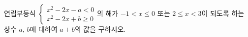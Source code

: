연립부등식 $\begin{cases} x^2-2x-a<0 \\ x^2-2x+b\ge 0 \end{cases}$의 해가 $-1<x\le 0$ 또는 $2\le x<3$이 되도록 하는 상수 $a$, $b$에 대하여 $a+b$의 값을 구하시오.

